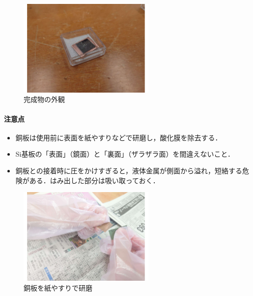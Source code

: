 \begin{figure}[H]
    \centering
    \includegraphics[width=0.6\textwidth]{figure/20250722_160238.pdf}
    \caption{完成物の外観}
\end{figure}


\paragraph{注意点}

\begin{itemize}
    \item 銅板は使用前に表面を紙やすりなどで研磨し，酸化膜を除去する．
    \item Si基板の「表面」（鏡面）と「裏面」（ザラザラ面）を間違えないこと．
    \item 銅板との接着時に圧をかけすぎると，液体金属が側面から溢れ，短絡する危険がある．はみ出した部分は吸い取っておく．
\end{itemize}

\begin{figure}[H]
    \centering
    \includegraphics[width=0.6\textwidth]{figure/20250722_153608.pdf}
    \caption{銅板を紙やすりで研磨}
\end{figure}